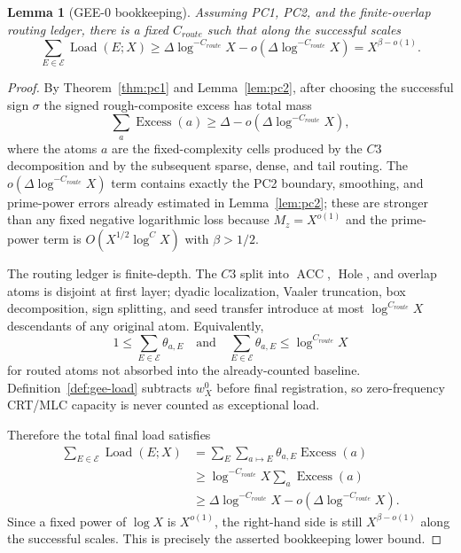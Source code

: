 \documentclass[11pt]{article}
\newtheorem{lemma}[theorem]{Lemma}
\theoremstyle{definition}
\newcommand{\ACC}{\operatorname{ACC}}
\newcommand{\Hole}{\operatorname{Hole}}
\begin{document}
\begin{lemma}[GEE-0 bookkeeping]\label{lem:gee0}
Assuming PC1, PC2, and the finite-overlap routing ledger, there is a fixed $C_{route}$ such that along the successful scales
\[
  \sum_{E\in\mathcal E}\operatorname{Load}(E;X)\ge \Delta\log^{-C_{route}}X-o(\Delta\log^{-C_{route}}X)=X^{\beta-o(1)}.
\]
\end{lemma}
\begin{proof}
By Theorem~\ref{thm:pc1} and Lemma~\ref{lem:pc2}, after choosing the successful sign $\sigma$ the signed rough-composite excess has total mass
\[
  \sum_a \operatorname{Excess}(a)\ge \Delta-o(\Delta\log^{-C_{route}}X),
\]
where the atoms $a$ are the fixed-complexity cells produced by the $C3$ decomposition and by the subsequent sparse, dense, and tail routing.  The $o(\Delta\log^{-C_{route}}X)$ term contains exactly the PC2 boundary, smoothing, and prime-power errors already estimated in Lemma~\ref{lem:pc2}; these are stronger than any fixed negative logarithmic loss because $M_z=X^{o(1)}$ and the prime-power term is $O(X^{1/2}\log^C X)$ with $\beta>1/2$.

The routing ledger is finite-depth.  The $C3$ split into $\ACC$, $\Hole$, and overlap atoms is disjoint at first layer; dyadic localization, Vaaler truncation, box decomposition, sign splitting, and seed transfer introduce at most $\log^{C_{route}}X$ descendants of any original atom.  Equivalently,
\[
  1\le \sum_{E\in\mathcal E}\theta_{a,E}
  \quad\text{and}\quad
  \sum_{E\in\mathcal E}\theta_{a,E}\le \log^{C_{route}}X
\]
for routed atoms not absorbed into the already-counted baseline.  Definition~\ref{def:gee-load} subtracts $w_X^0$ before final registration, so zero-frequency CRT/MLC capacity is never counted as exceptional load.

Therefore the total final load satisfies
\[
\begin{aligned}
  \sum_{E\in\mathcal E}\operatorname{Load}(E;X)
   &=\sum_E\sum_{a\mapsto E}\theta_{a,E}\operatorname{Excess}(a)\\
   &\ge \log^{-C_{route}}X\sum_a\operatorname{Excess}(a)\\
   &\ge \Delta\log^{-C_{route}}X-o(\Delta\log^{-C_{route}}X).
\end{aligned}
\]
Since a fixed power of $\log X$ is $X^{o(1)}$, the right-hand side is still $X^{\beta-o(1)}$ along the successful scales.  This is precisely the asserted bookkeeping lower bound.
\end{proof}
\end{document}
